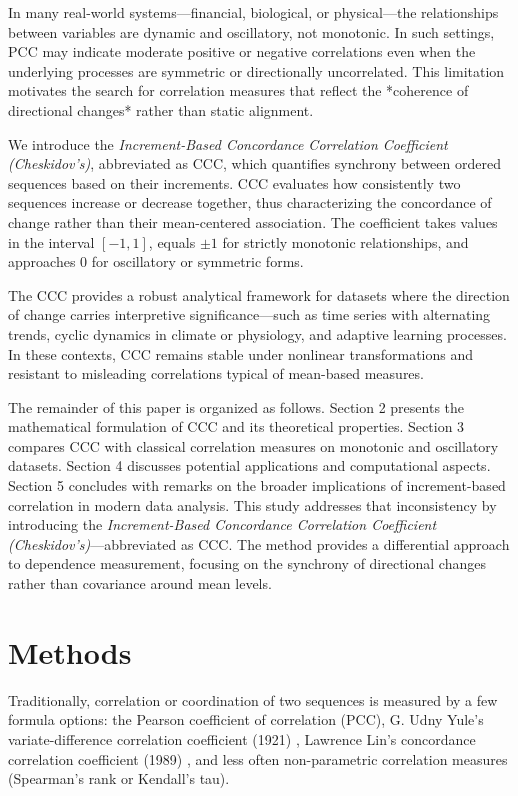 \documentclass[aos]{imsart}
\begin{document}
In many real-world systems—financial, biological, or physical—the relationships between variables are dynamic and oscillatory, not monotonic. In such settings, PCC may indicate moderate positive or negative correlations even when the underlying processes are symmetric or directionally uncorrelated. This limitation motivates the search for correlation measures that reflect the *coherence of directional changes* rather than static alignment.

We introduce the \textit{Increment-Based Concordance Correlation Coefficient (Cheskidov’s)}, abbreviated as CCC, which quantifies synchrony between ordered sequences based on their increments. CCC evaluates how consistently two sequences increase or decrease together, thus characterizing the concordance of change rather than their mean-centered association. The coefficient takes values in the interval $[-1, 1]$, equals $\pm 1$ for strictly monotonic relationships, and approaches $0$ for oscillatory or symmetric forms.

The CCC provides a robust analytical framework for datasets where the direction of change carries interpretive significance—such as time series with alternating trends, cyclic dynamics in climate or physiology, and adaptive learning processes. In these contexts, CCC remains stable under nonlinear transformations and resistant to misleading correlations typical of mean-based measures.

The remainder of this paper is organized as follows. Section 2 presents the mathematical formulation of CCC and its theoretical properties. Section 3 compares CCC with classical correlation measures on monotonic and oscillatory datasets. Section 4 discusses potential applications and computational aspects. Section 5 concludes with remarks on the broader implications of increment-based correlation in modern data analysis.
This study addresses that inconsistency by introducing the \textit{Increment-Based Concordance Correlation Coefficient (Cheskidov’s)}—abbreviated as CCC. The method provides a differential approach to dependence measurement, focusing on the synchrony of directional changes rather than covariance around mean levels.

\section{Methods}

Traditionally, correlation or coordination of two sequences is measured by a few formula options: the Pearson coefficient of correlation (PCC), G. Udny Yule’s variate-difference correlation coefficient (1921) \cite{r1}, Lawrence Lin’s concordance correlation coefficient (1989) \cite{r2}, and less often non-parametric correlation measures (Spearman’s rank or Kendall’s tau).
\end{document}
